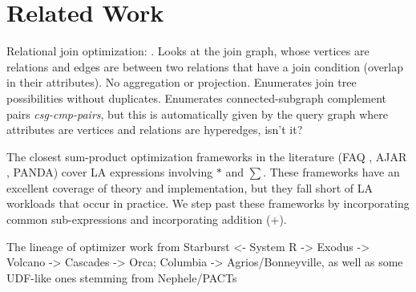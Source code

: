 








\section{Related Work}
Relational join optimization: \cite{moerkotte2006analysis}.
Looks at the join graph, whose vertices are relations and edges are between two relations that have a join condition (overlap in their attributes).  No aggregation or projection. Enumerates join tree possibilities without duplicates. Enumerates connected-subgraph complement pairs \emph{csg-cmp-pairs}, but this is automatically given by the query graph where attributes are vertices and relations are hyperedges, isn't it?

The closest sum-product optimization frameworks in the literature (FAQ \cite{KhamisNR16}, AJAR \cite{Joglekar2016AJARAA}, PANDA) cover LA expressions involving $*$ and $\sum$.
These frameworks have an excellent coverage of theory and implementation,
but they fall short of LA workloads that occur in practice.
We step past these frameworks by incorporating common sub-expressions and incorporating addition ($+$).


The lineage of optimizer work from Starburst <- System R -> Exodus -> Volcano -> Cascades ->  Orca; Columbia -> Agrios/Bonneyville, as well as some UDF-like ones stemming from Nephele/PACTs






